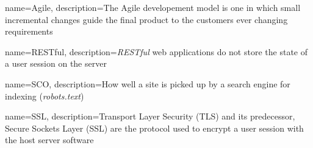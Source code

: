 {
  name={Agile},
  description={The Agile developement model is one in which small incremental changes guide the final product to the customers ever changing requirements}
}

{
  name={RESTful},
  description={\emph{RESTful} web applications do not store the state of a user session on the server}
}

{
  name={SCO},
  description={How well a site is picked up by a search engine for indexing (\emph{robots.text})}
}

{
  name={SSL},
  description={Transport Layer Security (TLS) and its predecessor, Secure Sockets Layer (SSL) are the protocol used to encrypt a user session with the host server software}
}


